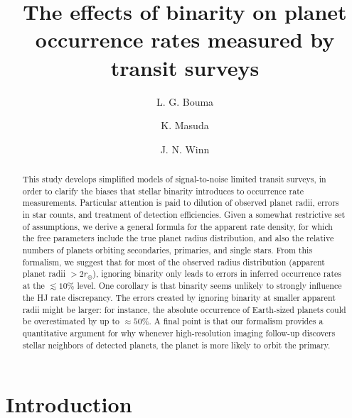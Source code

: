 \documentclass[12pt,modern]{aastex61}
\begin{document}
    
\title{ The effects of binarity on planet occurrence rates measured by transit 
surveys}
%
%
\author{L. G. Bouma}
\author{K. Masuda}
\author{J. N. Winn}
%
%
\begin{abstract}
%
This study develops simplified models of signal-to-noise limited transit 
surveys, in order to clarify the biases that stellar binarity introduces
to occurrence rate measurements.
Particular attention is paid to dilution of observed planet radii, errors in 
star counts, and treatment of detection efficiencies.
Given a somewhat restrictive set of assumptions, we derive a general formula 
for the apparent rate density, for which the free parameters include the true 
planet radius distribution, and also the relative numbers of planets 
orbiting secondaries, primaries, and single stars.
From this formalism, we suggest that for most of the observed radius 
distribution (apparent planet radii $>2r_\oplus$), ignoring binarity only 
leads to errors in inferred occurrence rates at the $\lesssim 10\%$ level.
One corollary is that binarity seems unlikely to strongly influence the HJ 
rate discrepancy.
The errors created by ignoring binarity at smaller apparent radii might be 
larger: for instance, the absolute occurrence of Earth-sized planets could be 
overestimated by up to $\approx 50\%$.
A final point is that our formalism provides a quantitative argument for why
whenever high-resolution imaging follow-up discovers stellar neighbors of 
detected planets, the planet is more likely to orbit the primary. 
%
\end{abstract}
%
%
%

%

\section{Introduction}
\end{document}
